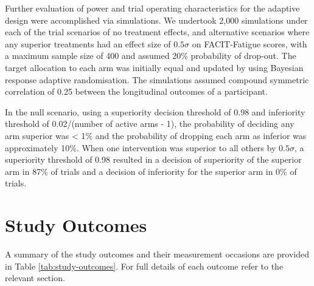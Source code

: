 \documentclass[
]{article}
\begin{document}
Further evaluation of power and trial operating characteristics for the adaptive design were accomplished via simulations.
We undertook 2,000 simulations under each of the trial scenarios of no treatment effects, and alternative scenarios where any superior treatments had an effect size of $0.5\sigma$ on FACIT-Fatigue scores, with a maximum sample size of 400 and assumed 20\% probability of drop-out.
The target allocation to each arm was initially equal and updated by using Bayesian response adaptive randomisation.
The simulations assumed compound symmetric correlation of 0.25 between the longitudinal outcomes of a participant.

In the null scenario, using a superiority decision threshold of 0.98 and inferiority threshold of 0.02/(number of active arms - 1), the probability of deciding any arm superior was < 1\% and the probability of dropping each arm as inferior was approximately 10\%.
When one intervention was superior to all others by $0.5\sigma$, a superiority threshold of 0.98 resulted in a decision of superiority of the superior arm in 87\% of trials and a decision of inferiority for the superior arm in 0\% of trials.

\clearpage

\hypertarget{outcomes}{
  \section{Study Outcomes}\label{outcomes}}

A summary of the study outcomes and their measurement occasions are provided in Table \ref{tab:study-outcomes}.
For full details of each outcome refer to the relevant section.
\end{document}
